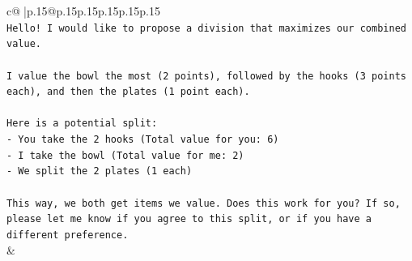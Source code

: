 \documentclass{article}
\begin{document}
{\begin{supertabular}{c@{$\;$}|p{.15\linewidth}@{}p{.15\linewidth}p{.15\linewidth}p{.15\linewidth}p{.15\linewidth}p{.15\linewidth}}
{{{\\ 
\texttt{Hello! I would like to propose a division that maximizes our combined value.} \\
\\ 
\texttt{I value the bowl the most (2 points), followed by the hooks (3 points each), and then the plates (1 point each).} \\
\\ 
\texttt{Here is a potential split:} \\
\texttt{{-} You take the 2 hooks (Total value for you: 6)} \\
\texttt{{-} I take the bowl (Total value for me: 2)} \\
\texttt{{-} We split the 2 plates (1 each)} \\
\\ 
\texttt{This way, we both get items we value. Does this work for you? If so, please let me know if you agree to this split, or if you have a different preference.} \\
            }
        }
    }
    & \\ \\


\end{supertabular}}
\end{document}

